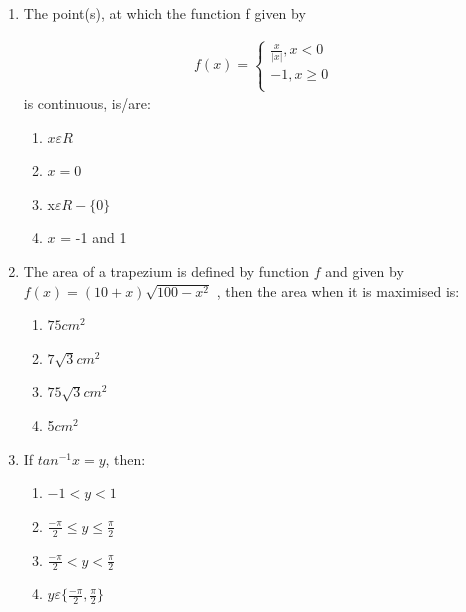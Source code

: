 \documentclass{article}
\begin{document}
\begin{enumerate}
\begin{enumerate}
\end{enumerate}

\item The point(s), at which the function f given by  

\begin{align*}
f(x) = \begin{cases}
\frac{x}{|x|}, x < 0 \\
-1 , x \geq 0 \\
\end{cases}
\end{align*}
is continuous, is/are:
\begin{enumerate}
     \item $x\varepsilon R$ 
     \item $x = 0$
     \item x$\varepsilon R -\{0\}$ 
     \item $x$ = -1 and 1 
\end{enumerate}

\item The area of a trapezium is defined by function $f$ and given by $f(x) = (10 + x)\sqrt{100-x^2}$
, then the area when it is maximised is: 
\begin{enumerate}
    \item $75cm^2$
    \item $7\sqrt{3}cm^2$
    \item $75\sqrt{3}cm^2$
    \item 5$cm^2$
\end{enumerate}

\item If $tan^{-1} x = y$, then: 
\begin{enumerate}
    \item $-1 < y < 1$
    \item $\frac{-\pi}{2} \leq y \leq \frac{\pi}{2}$
    \item $\frac{-\pi}{2} < y < \frac{\pi}{2}$
    \item $y \varepsilon\{\frac{-\pi}{2},\frac{\pi}{2}\}$
\end{enumerate}


\end{enumerate}
\end{document}
